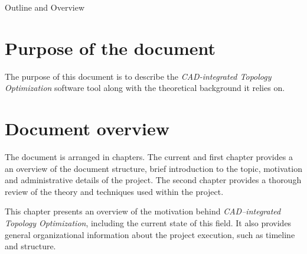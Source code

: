 \clearemptydoublepage

{}

\begin{center}
	\huge{Outline and Overview}
\end{center}




\section*{Purpose of the document}
The purpose of this document is to describe the \emph{CAD-integrated Topology Optimization} software tool along with the theoretical background it relies on.
%

\section*{Document overview}
The document is arranged in chapters. The current and first chapter provides a an overview of the document structure, brief introduction to the topic, motivation and administrative details of the project. The second chapter provides a thorough review of the theory and techniques used within the project.
  \vspace{1mm}

\noindent  This chapter presents an overview of the motivation behind \textit{CAD--integrated Topology Optimization}, including the current state of this field. It also provides general organizational information about the project execution, such as timeline and structure.
 \\


  \vspace{1mm}

